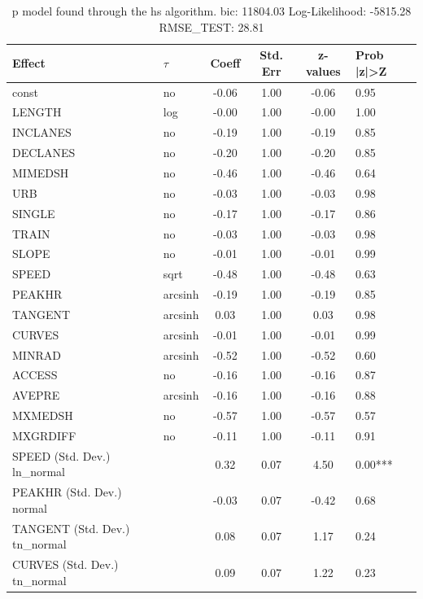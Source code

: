 \begin{table}
	\caption{p model found through the hs algorithm. bic: 11804.03 Log-Likelihood: -5815.28 RMSE_TEST: 28.81}
	\begin{center}
		\begin{tabular}{|l|l|c|c|c|l|}
			\hline
			Effect & $\tau$ & Coeff & Std. Err & z-values & Prob |z|>Z \\
			\hline
			const & no & -0.06 & 1.00 & -0.06 & 0.95 \\
			\hline
			LENGTH & log & -0.00 & 1.00 & -0.00 & 1.00 \\
			\hline
			INCLANES & no & -0.19 & 1.00 & -0.19 & 0.85 \\
			\hline
			DECLANES & no & -0.20 & 1.00 & -0.20 & 0.85 \\
			\hline
			MIMEDSH & no & -0.46 & 1.00 & -0.46 & 0.64 \\
			\hline
			URB & no & -0.03 & 1.00 & -0.03 & 0.98 \\
			\hline
			SINGLE & no & -0.17 & 1.00 & -0.17 & 0.86 \\
			\hline
			TRAIN & no & -0.03 & 1.00 & -0.03 & 0.98 \\
			\hline
			SLOPE & no & -0.01 & 1.00 & -0.01 & 0.99 \\
			\hline
			SPEED & sqrt & -0.48 & 1.00 & -0.48 & 0.63 \\
			\hline
			PEAKHR & arcsinh & -0.19 & 1.00 & -0.19 & 0.85 \\
			\hline
			TANGENT & arcsinh & 0.03 & 1.00 & 0.03 & 0.98 \\
			\hline
			CURVES & arcsinh & -0.01 & 1.00 & -0.01 & 0.99 \\
			\hline
			MINRAD & arcsinh & -0.52 & 1.00 & -0.52 & 0.60 \\
			\hline
			ACCESS & no & -0.16 & 1.00 & -0.16 & 0.87 \\
			\hline
			AVEPRE & arcsinh & -0.16 & 1.00 & -0.16 & 0.88 \\
			\hline
			MXMEDSH & no & -0.57 & 1.00 & -0.57 & 0.57 \\
			\hline
			MXGRDIFF & no & -0.11 & 1.00 & -0.11 & 0.91 \\
			\hline
			SPEED (Std. Dev.) ln_normal &  & 0.32 & 0.07 & 4.50 & 0.00*** \\
			\hline
			PEAKHR (Std. Dev.) normal &  & -0.03 & 0.07 & -0.42 & 0.68 \\
			\hline
			TANGENT (Std. Dev.) tn_normal &  & 0.08 & 0.07 & 1.17 & 0.24 \\
			\hline
			CURVES (Std. Dev.) tn_normal &  & 0.09 & 0.07 & 1.22 & 0.23 \\

\end{tabular}
\end{center}
\end{table}
